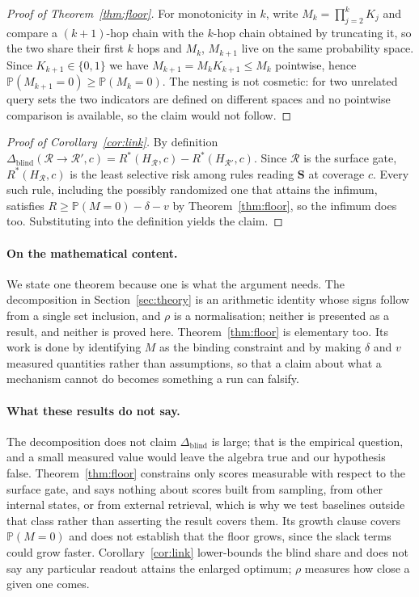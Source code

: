 \documentclass{article}
\newcommand{\gate}{\mathbf{S}}
\begin{document}
\begin{proof}[Proof of Theorem~\ref{thm:floor}]
For monotonicity in $k$, write $M_k=\prod_{j=2}^{k}K_j$ and compare a $(k{+}1)$-hop chain with the
$k$-hop chain obtained by truncating it, so the two share their first $k$ hops and $M_k$, $M_{k+1}$
live on the same probability space. Since $K_{k+1}\in\{0,1\}$ we have $M_{k+1}=M_kK_{k+1}\le M_k$
pointwise, hence $\mathbb{P}(M_{k+1}=0)\ge\mathbb{P}(M_k=0)$. The nesting is not cosmetic: for two
unrelated query sets the two indicators are defined on different spaces and no pointwise comparison
is available, so the claim would not follow.
\end{proof}


\begin{proof}[Proof of Corollary~\ref{cor:link}]
By definition $\Delta_{\mathrm{blind}}(\mathcal{R}\to\mathcal{R}',c)=R^\ast(H_{\mathcal{R}},c)-R^\ast(H_{\mathcal{R}'},c)$.
Since $\mathcal{R}$ is the surface gate, $R^\ast(H_{\mathcal{R}},c)$ is the least selective risk among
rules reading $\gate$ at coverage $c$. Every such rule, including the possibly randomized one that
attains the infimum, satisfies $R\ge\mathbb{P}(M=0)-\delta-v$ by Theorem~\ref{thm:floor}, so the
infimum does too. Substituting into the definition yields the claim.
\end{proof}

\paragraph{On the mathematical content.} We state one theorem because one is what the argument needs.
The decomposition in Section~\ref{sec:theory} is an arithmetic identity whose signs follow from a
single set inclusion, and $\rho$ is a normalisation; neither is presented as a result, and neither is
proved here. Theorem~\ref{thm:floor} is elementary too. Its work is done by identifying $M$ as the
binding constraint and by making $\delta$ and $v$ measured quantities rather than assumptions, so
that a claim about what a mechanism cannot do becomes something a run can falsify.

\paragraph{What these results do not say.} The decomposition does not claim
$\Delta_{\mathrm{blind}}$ is large; that is the empirical question, and a small measured value would
leave the algebra true and our hypothesis false. Theorem~\ref{thm:floor} constrains only scores
measurable with respect to the surface gate, and says nothing about scores built from sampling, from
other internal states, or from external retrieval, which is why we test baselines outside that class
rather than asserting the result covers them. Its growth clause covers $\mathbb{P}(M=0)$ and does not
establish that the floor grows, since the slack terms could grow faster. Corollary~\ref{cor:link}
lower-bounds the blind share and does not say any particular readout attains the enlarged optimum;
$\rho$ measures how close a given one comes.
\end{document}
